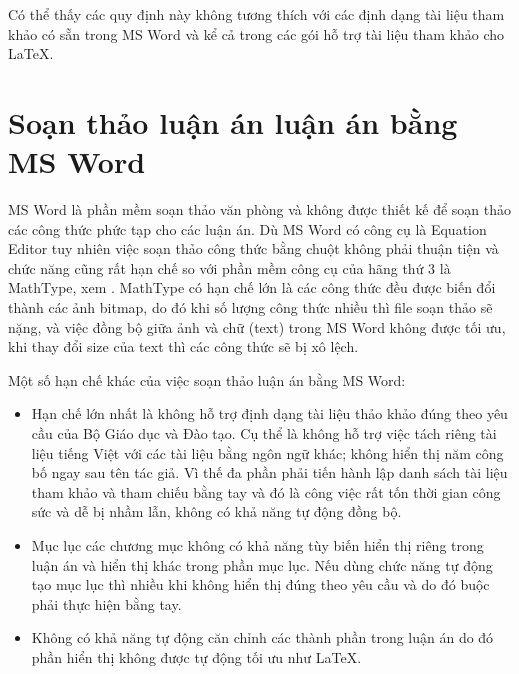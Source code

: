 Có thể thấy các quy định này không tương thích với các định dạng tài liệu tham khảo có sẵn trong MS Word và kể cả trong các gói hỗ trợ tài liệu tham khảo cho \LaTeX.

\section{\bf Soạn thảo luận án luận án bằng MS Word}

MS Word là phần mềm soạn thảo văn phòng và không được thiết kế để soạn thảo các công thức phức tạp cho các luận án. Dù MS Word có công cụ là Equation Editor tuy nhiên việc soạn thảo công thức bằng chuột không phải thuận tiện và chức năng cũng rất hạn chế so với phần mềm công cụ của hãng thứ 3 là MathType, xem \cite{web1}. MathType có hạn chế lớn là các công thức đều được biến đổi thành các ảnh bitmap, do đó khi số lượng công thức nhiều thì file soạn thảo sẽ nặng, và việc đồng bộ giữa ảnh và chữ (text) trong MS Word không được tối ưu, khi thay đổi size của text thì các công thức sẽ bị xô lệch. 

Một số hạn chế khác của việc soạn thảo luận án bằng MS Word:
\begin{itemize}
	\item Hạn chế lớn nhất là không hỗ trợ định dạng tài liệu thảo khảo đúng theo yêu cầu của Bộ Giáo dục và Đào tạo. Cụ thể là không hỗ trợ việc tách riêng tài liệu tiếng Việt với các tài liệu bằng ngôn ngữ khác; không hiển thị năm công bố ngay sau tên tác giả. Vì thế đa phần phải tiến hành lập danh sách tài liệu tham khảo và tham chiếu bằng tay và đó là công việc rất tốn thời gian công sức và dễ bị nhầm lẫn, không có khả năng tự động đồng bộ.
	\item Mục lục các chương mục không có khả năng tùy biến hiển thị riêng trong luận án và hiển thị khác trong phần mục lục. Nếu dùng chức năng tự động tạo mục lục thì nhiều khi không hiển thị đúng theo yêu cầu và do đó buộc phải thực hiện bằng tay.
	\item Không có khả năng tự động căn chỉnh các thành phần trong luận án do đó phần hiển thị không được tự động tối ưu như \LaTeX.
\end{itemize}

